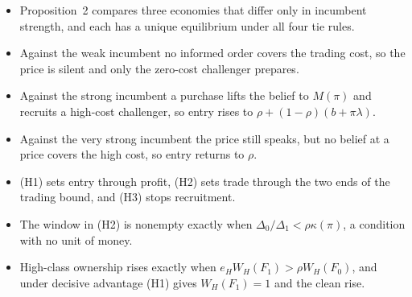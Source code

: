 \begin{chaptersummary}
\begin{itemize}
\item Proposition~2 compares three economies that differ only in incumbent strength, and each has a unique
  equilibrium under all four tie rules.
\item Against the weak incumbent no informed order covers the trading cost, so the price is silent and only the
  zero-cost challenger prepares.
\item Against the strong incumbent a purchase lifts the belief to \(M(\pi)\) and recruits a high-cost challenger,
  so entry rises to \(\rho+(1-\rho)(b+\pi\lambda)\).
\item Against the very strong incumbent the price still speaks, but no belief at a price covers the high cost, so
  entry returns to \(\rho\).
\item (H1) sets entry through profit, (H2) sets trade through the two ends of the trading bound, and (H3) stops
  recruitment.
\item The window in (H2) is nonempty exactly when \(\Delta_0/\Delta_1<\rho\kappa(\pi)\), a condition with no unit of
  money.
\item High-class ownership rises exactly when \(e_HW_H(F_1)>\rho W_H(F_0)\), and under decisive advantage (H1) gives
  \(W_H(F_1)=1\) and the clean rise.
\end{itemize}
\end{chaptersummary}

\answersection


